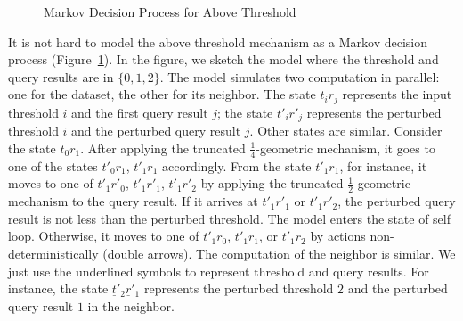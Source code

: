 \begin{figure}
{
    }
  \caption{Markov Decision Process for Above Threshold}
  \label{figure:mdp-above-threshold}
\end{figure}

It is not hard to model the above threshold mechanism as a Markov
decision process (Figure~\ref{figure:mdp-above-threshold}). In the
figure, we sketch the model where the threshold and query results are
in $\{ 0, 1, 2 \}$. The model simulates two computation in parallel:
one for the dataset, the other for its neighbor. The state $t_ir_j$
represents the input threshold $i$ and the first query result
$j$; the state $t'_ir'_j$ represents the perturbed threshold $i$ and
the perturbed query result $j$. Other states are similar. Consider the
state $t_0r_1$. After applying the truncated $\frac{1}{4}$-geometric
mechanism, it goes to one of the states $t'_0r_1$, $t'_1r_1$
accordingly. From the state $t'_1r_1$, for instance, it moves to one
of $t'_1r'_0$, $t'_1r'_1$, $t'_1r'_2$ by applying the truncated
$\frac{1}{2}$-geometric mechanism to the query result. If it arrives
at $t'_1r'_1$ or $t'_1r'_2$, the perturbed query result is not less
than the perturbed threshold. The model enters the state of self
loop. Otherwise, it moves to one of $t'_1r_0$, $t'_1r_1$, or $t'_1r_2$
by actions non-deterministically (double arrows). The computation of
the neighbor is similar. We just use the underlined symbols to
represent threshold and query results. For instance, the state
$\underline{t}'_2\underline{r}'_1$ represents the perturbed threshold
$2$ and the perturbed query result $1$ in the neighbor.

